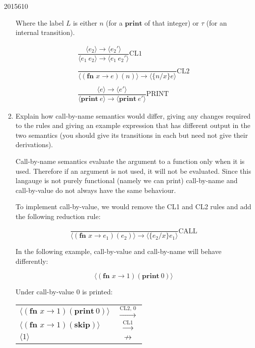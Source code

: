 \documentclass[10pt,\jkfside,a4paper]{article}
\begin{document}
\begin{examquestion}{2015}{6}{10}
\begin{enumerate}[label=(\alph*)]
Where the label $L$ is either $n$ (for a $\mathbf{print}$ of that integer)
or $\tau$ (for an internal transition).

\begin{gather*}
\dfrac{\langle e_2 \rangle\to\langle e_2' \rangle}{\langle e_1 \ e_2
\rangle\to \langle e_1 \ e_2' \rangle}\text{CL1}\\\\
\dfrac{}{\langle \left(\textbf{fn }x
\to e \right)(n) \rangle\to \langle \{n/x\}e \rangle}\text{CL2}\\\\
\dfrac{\langle e \rangle \to \langle e' \rangle}{\langle \mathbf{print} \ e
\rangle \to \langle \mathbf{print} \ e' \rangle}\text{PRINT}
\end{gather*}

\item Explain how call-by-name semantics would differ, giving any changes
required to the rules and giving an example expression that has different
output in the two semantics (you should give its transitions in each but
need not give their derivations).

Call-by-name semantics evaluate the argument to a function only when it is
used. Therefore if an argument is not used, it will not be evaluated.
Since this langauge is not purely functional (namely we can print)
call-by-name and call-by-value do not always have the same behaviour.

To implement call-by-value, we would remove the CL1 and CL2 rules and add
the following reduction rule:

\[
\dfrac{}{\langle \left(\textbf{fn }x
\to e_1 \right)(e_2) \rangle\to \langle \{e_2/x\}e_1 \rangle}\text{CALL}
\]

In the following example, call-by-value and call-by-name will behave 
differently:

\[
\langle (\textbf{fn }x \to 1)(\mathbf{print} \ 0) \rangle
\]

Under call-by-value 0 is printed:
\begin{table}[H]
\centering
\begin{tabular}{l c}
$\langle (\textbf{fn }x \to 1)(\mathbf{print} \ 0) \rangle$ &
$\stackrel{\text{CL2, 0}}{\to}$ \\
$\langle (\textbf{fn }x \to 1)(\mathbf{skip}) \rangle$ &
$\stackrel{\text{CL1}}{\to}$ \\
$\langle 1 \rangle$ &
$\not\to$ \\
\end{tabular}
\end{table}


\end{enumerate}
\end{examquestion}
\end{document}
